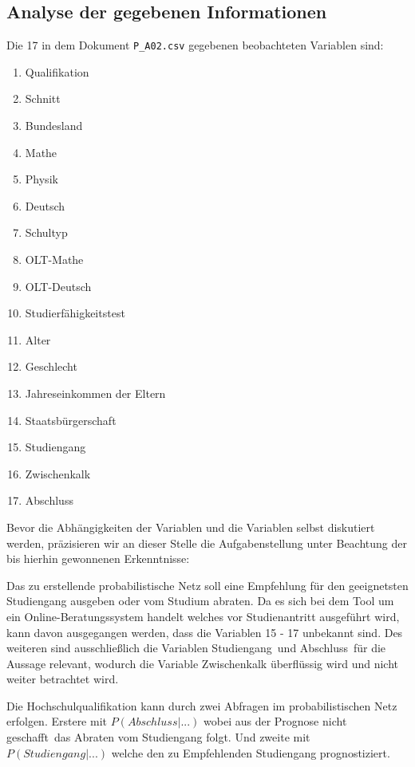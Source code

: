 \subsection*{Analyse der gegebenen Informationen}\label{analyse}
Die 17 in dem Dokument \lstinline{P_A02.csv} gegebenen beobachteten Variablen sind:
\begin{singlespace}
\begin{multicols}{2}
\begin{enumerate}
	\item Qualifikation
	\item Schnitt
	\item Bundesland
	\item Mathe
	\item Physik
	\item Deutsch
	\item Schultyp
	\item OLT-Mathe
	\item OLT-Deutsch
	\item Studierfähigkeitstest
	\item Alter
	\item Geschlecht
	\item Jahreseinkommen der Eltern
	\item Staatsbürgerschaft
	\item Studiengang
	\item Zwischenkalk
	\item Abschluss
\end{enumerate}
\end{multicols}
\end{singlespace}

Bevor die Abhängigkeiten der Variablen und die Variablen selbst diskutiert werden, präzisieren wir an dieser Stelle die Aufgabenstellung unter Beachtung der bis hierhin gewonnenen Erkenntnisse:  


Das zu erstellende probabilistische Netz soll eine Empfehlung für den geeignetsten Studiengang ausgeben oder vom Studium abraten. Da es sich bei dem Tool um ein Online-Beratungssystem handelt welches vor Studienantritt ausgeführt wird, kann davon ausgegangen werden, dass die Variablen 15 - 17 unbekannt sind. Des weiteren sind ausschließlich die Variablen \glqq Studiengang\grqq \ und \glqq Abschluss\grqq \ für die Aussage relevant, wodurch die Variable Zwischenkalk überflüssig wird und nicht weiter betrachtet wird. 

Die Hochschulqualifikation kann durch zwei Abfragen im probabilistischen Netz erfolgen. Erstere mit $P(Abschluss|...)$ wobei aus der Prognose \glqq nicht geschafft\grqq \ das Abraten vom Studiengang folgt. Und zweite mit $P(Studiengang|...)$ welche den zu Empfehlenden Studiengang prognostiziert. 

